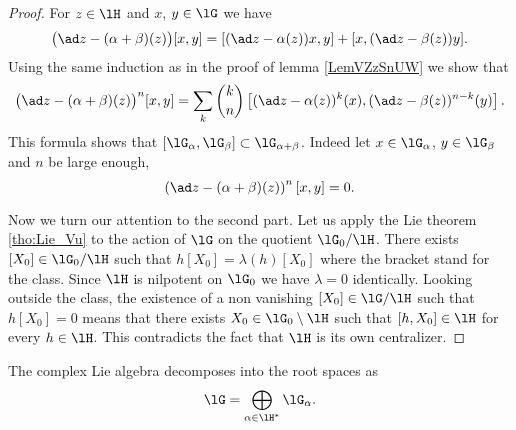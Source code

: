 \begin{proof}
For $z\in\lH$ and $x$, $y\in\lG$ we have
\begin{equation}
\big( \ad z-(\alpha+\beta)(z) \big)[x,y]=[ (\ad z-\alpha(z))x,y ]+[ x,(\ad z-\beta(z))y ].
\end{equation}
Using the same induction as in the proof of lemma \ref{LemVZzSnUW} we show that
\begin{equation}
\big( \ad z-(\alpha+\beta)(z) \big)^n[x,y]=\sum_k \binom{k}{n}
\left[
(\ad z-\alpha(z))^k(x),(\ad z-\beta(z))^{n-k}(y)
\right].
\end{equation}
This formula shows that $[\lG_{\alpha},\lG_{\beta}]\subset\lG_{\alpha+\beta}$. Indeed let $x\in\lG_{\alpha}$, $y\in\lG_{\beta}$ and $n$ be large enough,
\begin{equation}
    \left( \ad z-(\alpha+\beta)(z) \right)^n[x,y]=0.
\end{equation}

    Now we turn our attention to the second part. Let us apply the Lie theorem \ref{tho:Lie_Vu} to the action of \( \lG\) on the quotient \( \lG_0/\lH\). There exists \( [X_0]\in\lG_0/\lH\) such that \( h[X_0]=\lambda(h)[X_0]\) where the bracket stand for the class. Since \( \lH\) is nilpotent on \( \lG_0\) we have \( \lambda=0\) identically. Looking outside the class, the existence of a non vanishing \( [X_0]\in\lG/\lH\) such that \( h[X_0]=0\) means that there exists \( X_0\in\lG_0\setminus\lH\) such that \( [h,X_0]\in\lH\) for every \( h\in\lH\). This contradicts the fact that \( \lH\) is its own centralizer.
\end{proof}

\begin{proposition}
    The complex Lie algebra decomposes into the root spaces as
    \begin{equation}
        \lG=\bigoplus_{\alpha\in\lH^*}\lG_{\alpha}.
    \end{equation}
\end{proposition}

